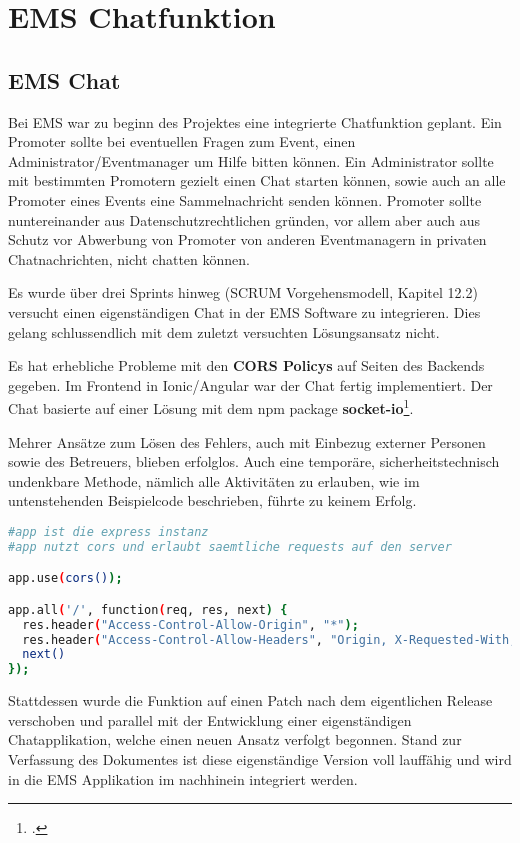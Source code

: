 \chapter{EMS Chatfunktion}
\putz

\section{EMS Chat}
Bei EMS war zu beginn des Projektes eine integrierte Chatfunktion geplant. Ein Promoter sollte bei eventuellen Fragen zum Event, einen Administrator/Eventmanager um Hilfe bitten können. Ein Administrator sollte mit bestimmten
Promotern gezielt einen Chat starten können, sowie auch an alle Promoter eines Events eine Sammelnachricht senden können. Promoter sollte nuntereinander aus Datenschutzrechtlichen gründen, vor allem aber auch
aus Schutz vor Abwerbung von Promoter von anderen Eventmanagern in privaten Chatnachrichten, nicht chatten können.

Es wurde über drei Sprints hinweg (SCRUM Vorgehensmodell, Kapitel 12.2) versucht einen eigenständigen Chat in der EMS Software zu integrieren. Dies gelang schlussendlich mit dem zuletzt versuchten Lösungsansatz nicht.

Es hat erhebliche Probleme mit den \textbf{CORS Policys} auf Seiten des Backends gegeben. Im Frontend in Ionic/Angular war der Chat fertig implementiert. Der Chat basierte auf einer Lösung mit dem npm package \textbf{socket-io}\footcite{socket-io}.

Mehrer Ansätze zum Lösen des Fehlers, auch mit Einbezug externer Personen sowie des Betreuers, blieben erfolglos. Auch eine temporäre, sicherheitstechnisch undenkbare Methode, nämlich alle Aktivitäten zu erlauben, wie im untenstehenden Beispielcode beschrieben, führte zu keinem Erfolg.

\begin{lstlisting}[language=bash]
#app ist die express instanz
#app nutzt cors und erlaubt saemtliche requests auf den server 

app.use(cors());

app.all('/', function(req, res, next) {
  res.header("Access-Control-Allow-Origin", "*");
  res.header("Access-Control-Allow-Headers", "Origin, X-Requested-With, Content-Type, Accept");
  next()
});
\end{lstlisting}

Stattdessen wurde die Funktion auf einen Patch nach dem eigentlichen Release verschoben und parallel mit der Entwicklung einer eigenständigen Chatapplikation, welche einen neuen Ansatz verfolgt begonnen. Stand zur Verfassung des Dokumentes ist diese eigenständige Version
voll lauffähig und wird in die EMS Applikation im nachhinein integriert werden.

